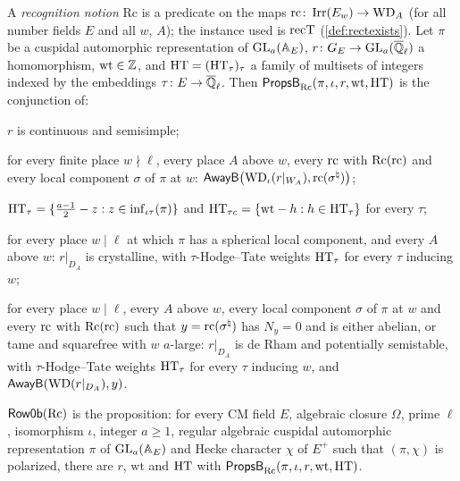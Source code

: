 \begin{definition}\label{def:row0b}
A \emph{recognition notion} $\mathrm{Rc}$ is a predicate on the maps
$\mathrm{rc}\colon\operatorname{Irr}(E_w)\to\mathrm{WD}_A$ (for all number fields $E$ and all $w$, $A$); the
instance used is $\mathrm{recT}$ (\cref{def:rectexists}). Let $\pi$ be a cuspidal automorphic
representation of $\operatorname{GL}_a(\mathbb{A}_E)$, $r\colon G_E\to\operatorname{GL}_a(\overline{\mathbb{Q}}_\ell)$ a homomorphism, $\mathrm{wt}\in\mathbb{Z}$, and
$\mathrm{HT}=(\mathrm{HT}_\tau)_\tau$ a family of multisets of integers indexed by the embeddings
$\tau\colon E\to\overline{\mathbb{Q}}_\ell$. Then $\mathsf{PropsB}_{\mathrm{Rc}}(\pi,\iota,r,\mathrm{wt},\mathrm{HT})$ is the
conjunction of:
\begin{description}[nosep]
\item[(cont, ss)] $r$ is continuous and semisimple;
\item[(away)] for every finite place $w\nmid\ell$, every place $A$ above $w$, every $\mathrm{rc}$ with
  $\mathrm{Rc}(\mathrm{rc})$ and every local component $\sigma$ of $\pi$ at $w$:
  $\mathsf{AwayB}\bigl(\mathrm{WD}_\iota(r|_{W_A}),\mathrm{rc}(\sigma^\natural)\bigr)$;
\item[(weights)] $\mathrm{HT}_\tau=\{\frac{a-1}2-z:z\in\operatorname{inf}_{\iota\tau}(\pi)\}$ and
  $\mathrm{HT}_{\tau c}=\{\mathrm{wt}-h:h\in\mathrm{HT}_\tau\}$ for every $\tau$;
\item[(crys)] for every place $w\mid\ell$ at which $\pi$ has a spherical local component, and every
  $A$ above $w$: $r|_{D_A}$ is crystalline, with $\tau$-Hodge--Tate weights $\mathrm{HT}_\tau$ for every
  $\tau$ inducing $w$;
\item[(nice)] for every place $w\mid\ell$, every $A$ above $w$, every local component $\sigma$ of $\pi$
  at $w$ and every $\mathrm{rc}$ with $\mathrm{Rc}(\mathrm{rc})$ such that $y=\mathrm{rc}(\sigma^\natural)$ has
  $N_y=0$ and is either abelian, or tame and squarefree with $w$ $a$-large: $r|_{D_A}$ is de Rham and
  potentially semistable, with $\tau$-Hodge--Tate weights $\mathrm{HT}_\tau$ for every $\tau$ inducing $w$,
  and $\mathsf{AwayB}(\mathrm{WD}(r|_{D_A}),y)$.
\end{description}
$\mathsf{Row0b}(\mathrm{Rc})$ is the proposition: for every CM field $E$, algebraic closure $\Omega$,
prime $\ell$, isomorphism $\iota$, integer $a\ge1$, regular algebraic cuspidal automorphic
representation $\pi$ of $\operatorname{GL}_a(\mathbb{A}_E)$ and Hecke character $\chi$ of $E^+$ such that $(\pi,\chi)$ is
polarized, there are $r$, $\mathrm{wt}$ and $\mathrm{HT}$ with
$\mathsf{PropsB}_{\mathrm{Rc}}(\pi,\iota,r,\mathrm{wt},\mathrm{HT})$.
\end{definition}

